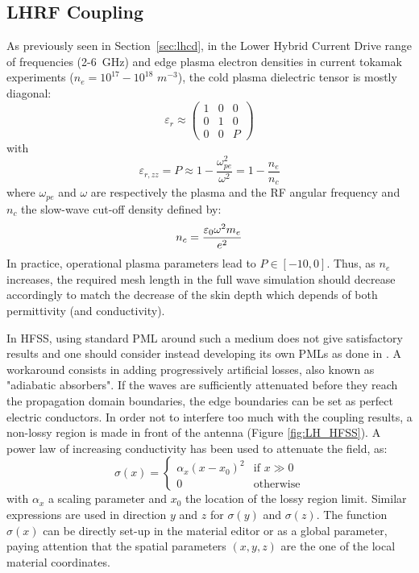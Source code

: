 \subsection{LHRF Coupling}
As previously seen in Section~\ref{sec:lhcd}, in the Lower Hybrid Current Drive range of frequencies (2-6~GHz) and edge plasma electron densities in current tokamak experiments ($n_e=10^{17}-10^{18}$ $\si{m^{-3}}$), the cold plasma dielectric tensor is mostly diagonal:
 \begin{equation}
 \varepsilon_r 
 \approx
 \left(
 \begin{array}{ccc}
 1 & 0 & 0 \\
 0 & 1 & 0 \\
 0 & 0 & P
 \end{array}
 \right)
 \label{eq:stix_tensor_lhrf}
 \end{equation}
with
\begin{equation}
\varepsilon_{r,zz} = P\approx 1 - \frac{\omega_{pe}^2}{\omega^2} = 1 - \frac{n_e}{n_c}
\end{equation}
where $\omega_{pe}$ and $\omega$ are respectively the plasma and the RF angular frequency and $n_c$ the slow-wave cut-off density defined by:
\begin{equation}
	n_c = \frac{ \varepsilon_0 \omega^2 m_e}{e^2}
	\label{{eq:cutoff_density_lh}}
\end{equation}
In practice, operational plasma parameters lead to  $P\in[-10,0]$. Thus, as  $n_e$ increases, the required mesh length in the full wave simulation should decrease accordingly to match the decrease of the skin depth which depends of both  permittivity (and conductivity). 

In HFSS, using standard PML around such a medium does not give satisfactory results and one should consider instead developing its own PMLs as done in \cite{jacquot2013}. A workaround consists in adding progressively artificial losses, also known as "adiabatic absorbers"\cite{oskooi2008}. If the waves are sufficiently attenuated before they reach the propagation domain boundaries, the edge boundaries can be set as perfect electric conductors. In order not to interfere too much with the coupling results, a non-lossy region is made in front of the antenna (Figure \ref{fig:LH_HFSS}).  A power law of increasing conductivity has been used to attenuate the field, as:
\begin{equation}
\sigma(x) =  
\begin{cases} 
	\alpha_x (x - x_0)^2 & \mbox{if } x \gg 0 \\
	0 & \mbox{otherwise}
\end{cases}	
\end{equation}
with  $\alpha_x$  a scaling parameter and $x_0$ the location of the lossy region limit. Similar  expressions are used  in direction $y$ and $z$  for $\sigma(y)$ and $\sigma(z)$. The function $\sigma(x)$ can be directly set-up in the material editor or as a global parameter, paying attention that the spatial parameters $(x,y,z)$ are the one of the local material coordinates. 

